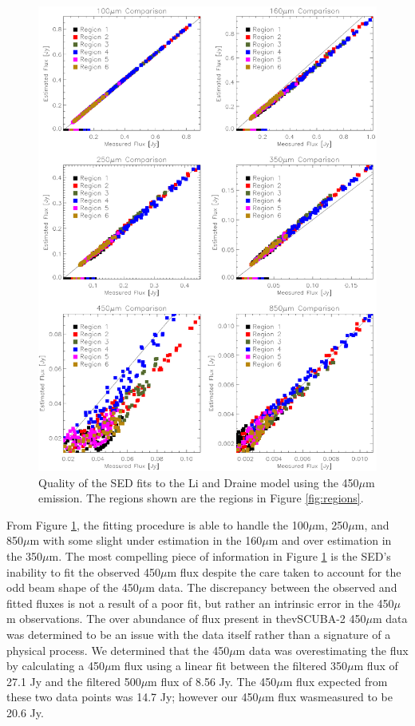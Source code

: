 \begin{figure}
  \centering
  \includegraphics[width=1.\textwidth]{sed_imgs/flux_compare_2_4.eps}
  \caption[Li and Draine Model SED Fit Quality Using 450$\mu$m Data]{Quality of the SED fits to the Li and Draine model using the 450$\mu$m emission.  The regions shown are the regions in Figure \ref{fig:regions}.}
  \label{fig:w2_4}
\end{figure}

From Figure \ref{fig:w2_4}, the fitting procedure is able to handle the 100$\mu$m, 250$\mu$m, and 850$\mu$m with some slight under estimation in the 160$\mu$m and over  estimation in the 350$\mu$m.  The most compelling piece of information in Figure \ref{fig:w2_4} is the SED's inability to fit the observed 450$\mu$m flux despite the care taken to account for the odd beam shape of the 450$\mu$m data.  The discrepancy between the observed and fitted fluxes is not a result of a poor fit, but rather an intrinsic error in the 450$\mu$m observations.  The over abundance of flux present in thevSCUBA-2 450$\mu$m data was determined to be an issue with the data itself rather than a signature of a physical process.  We determined that the 450$\mu$m data was overestimating the flux by calculating a 450$\mu$m flux using a linear fit between the filtered 350$\mu$m flux of 27.1 Jy and the filtered 500$\mu$m flux of 8.56 Jy.  The 450$\mu$m flux expected from these two data points was 14.7 Jy; however our 450$\mu$m flux wasmeasured to be 20.6 Jy.

